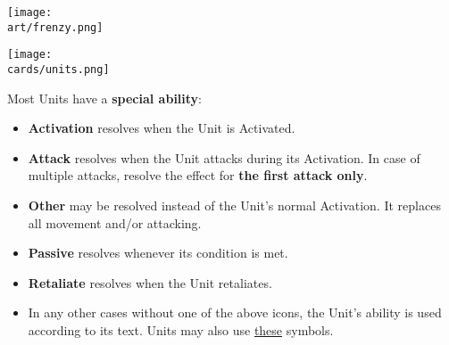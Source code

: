 \begin{multicols}{2}
\begin{scaledfigure}[blanker]
  \centering
  \texttt{[image: \\art/frenzy.png]}
\end{scaledfigure}

\begin{center}
  \texttt{[image: \\cards/units.png]}
\end{center}
\bigskip

\vspace*{\fill}

Most Units have a \textbf{special ability}:\par
\begin{itemize}[wide]
  \item\textbf{Activation}  resolves when the Unit is Activated.
  \item\textbf{Attack}  resolves when the Unit attacks during its Activation.
    In case of multiple attacks, resolve the effect for \textbf{the first attack only}.
  \item\textbf{Other}  may be resolved instead of the Unit's normal Activation.
    It replaces all movement and/or attacking.
  \item\textbf{Passive}  resolves whenever its condition is met.
  \item\textbf{Retaliate}  resolves when the Unit retaliates.
  \item In any other cases without one of the above icons, the Unit's ability is used according to its text.
    Units may also use \hyperlink{Playerdecks}{these} symbols.
\end{itemize}

\vspace*{\fill}

\columnbreak


\end{multicols}
